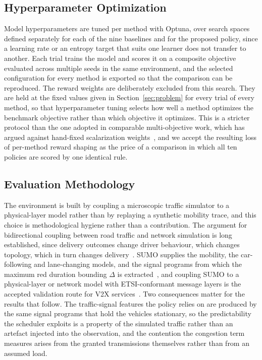 \documentclass[journal]{IEEEtran}
\begin{document}
\subsection{Hyperparameter Optimization}
Model hyperparameters are tuned per method with Optuna, over search spaces defined separately for each of the nine baselines and for the proposed policy, since a learning rate or an entropy target that suits one learner does not transfer to another. Each trial trains the model and scores it on a composite objective evaluated across multiple seeds in the same environment, and the selected configuration for every method is exported so that the comparison can be reproduced. The reward weights are deliberately excluded from this search. They are held at the fixed values given in Section~\ref{sec:problem} for every trial of every method, so that hyperparameter tuning selects how well a method optimizes the benchmark objective rather than which objective it optimizes. This is a stricter protocol than the one adopted in comparable multi-objective work, which has argued against hand-fixed scalarization weights~\cite{xu20232}, and we accept the resulting loss of per-method reward shaping as the price of a comparison in which all ten policies are scored by one identical rule.

\subsection{Evaluation Methodology}
The environment is built by coupling a microscopic traffic simulator to a physical-layer model rather than by replaying a synthetic mobility trace, and this choice is methodological hygiene rather than a contribution. The argument for bidirectional coupling between road traffic and network simulation is long established, since delivery outcomes change driver behaviour, which changes topology, which in turn changes delivery~\cite{sommer2011}. SUMO supplies the mobility, the car-following and lane-changing models, and the signal programs from which the maximum red duration bounding $\Delta$ is extracted~\cite{lopez2018}, and coupling SUMO to a physical-layer or network model with ETSI-conformant message layers is the accepted validation route for V2X services~\cite{raviglione2024}. Two consequences matter for the results that follow. The traffic-signal features the policy relies on are produced by the same signal programs that hold the vehicles stationary, so the predictability the scheduler exploits is a property of the simulated traffic rather than an artefact injected into the observation, and the contention the congestion term measures arises from the granted transmissions themselves rather than from an assumed load.
\end{document}
